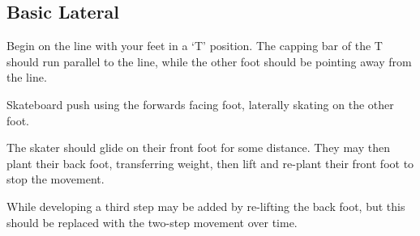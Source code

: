 \subsection*{Basic Lateral}

Begin on the line with your feet in a `T' position. The capping bar of the T should run parallel to the line, while the other foot should be pointing away from the line.     

Skateboard push using the forwards facing foot, laterally skating on the other foot.   

The skater should glide on their front foot for some distance.
They may then plant their back foot, transferring weight, then lift and re-plant their front foot to stop the movement. 

While developing a third step may be added by re-lifting the back foot, but this should be replaced with the two-step movement over time.
